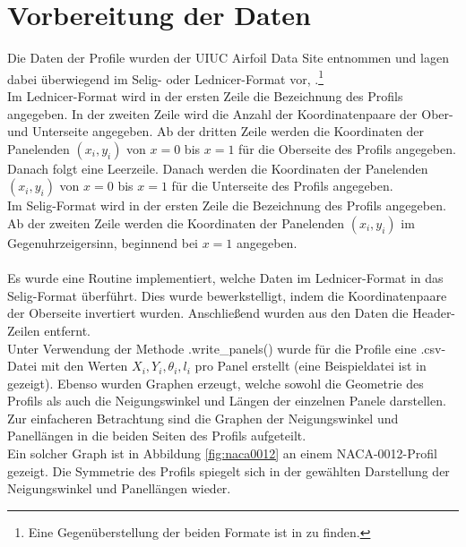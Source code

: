 \section{Vorbereitung der Daten}
Die Daten der Profile wurden der UIUC Airfoil Data Site entnommen und lagen dabei überwiegend im Selig- oder Lednicer-Format vor, \cite{uiuc}.\footnote{Eine Gegenüberstellung der beiden Formate ist in  zu finden.}
\\
Im Lednicer-Format wird in der ersten Zeile die Bezeichnung des Profils angegeben. In der zweiten Zeile wird die Anzahl der Koordinatenpaare der Ober- und Unterseite angegeben. Ab der dritten Zeile werden die Koordinaten der Panelenden $(x_i,y_i)$ von $x=0$ bis $x=1$ für die Oberseite des Profils angegeben. Danach folgt eine Leerzeile. Danach werden die Koordinaten der Panelenden $(x_i,y_i)$ von $x=0$ bis $x=1$ für die Unterseite des Profils angegeben.
\\
Im Selig-Format wird in der ersten Zeile die Bezeichnung des Profils angegeben. Ab der zweiten Zeile werden die Koordinaten der Panelenden $(x_i,y_i)$ im Gegenuhrzeigersinn, beginnend bei $x=1$ angegeben.
\\\\
Es wurde eine Routine implementiert, welche Daten im Lednicer-Format in das Selig-Format überführt. Dies wurde bewerkstelligt, indem die Koordinatenpaare der Oberseite invertiert wurden. Anschließend wurden aus den Daten die Header-Zeilen entfernt. \\
Unter Verwendung der Methode .write\_panels() wurde für die Profile eine .csv-Datei mit den Werten $X_i, Y_i, \theta _i, l_i$ pro Panel erstellt (eine Beispieldatei ist in  gezeigt). Ebenso wurden Graphen erzeugt, welche sowohl die Geometrie des Profils als auch die Neigungswinkel und Längen der einzelnen Panele darstellen. Zur einfacheren Betrachtung sind die Graphen der Neigungswinkel und Panellängen in die beiden Seiten des Profils aufgeteilt. 
\\Ein solcher Graph ist in Abbildung \ref{fig:naca0012} an einem NACA-0012-Profil gezeigt. Die Symmetrie des Profils spiegelt sich in der gewählten Darstellung der Neigungswinkel und Panellängen wieder.


